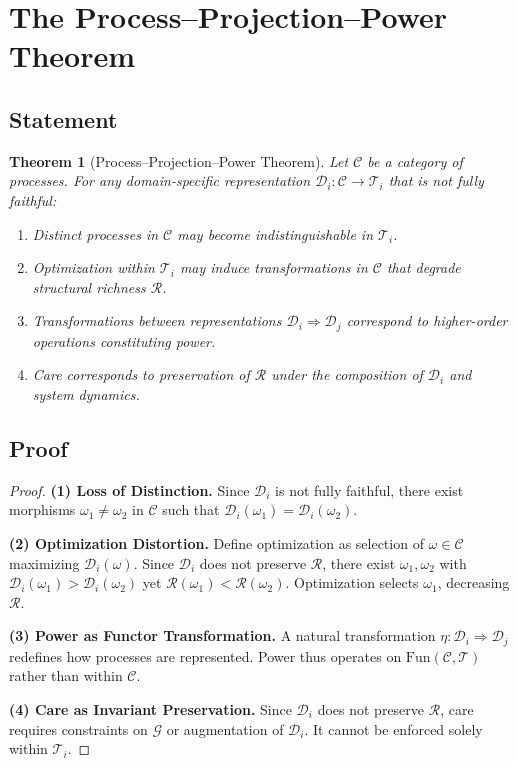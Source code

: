\documentclass[11pt,a4paper]{article}
\newtheorem{theorem}{Theorem}[section]
\theoremstyle{definition}
\theoremstyle{remark}
\begin{document}
\section{The Process--Projection--Power Theorem}

\subsection{Statement}

\begin{theorem}[Process--Projection--Power Theorem]
Let $\mathcal{C}$ be a category of processes. For any domain-specific representation $\mathcal{D}_i : \mathcal{C} \to \mathcal{T}_i$ that is not fully faithful:
\begin{enumerate}
\item Distinct processes in $\mathcal{C}$ may become indistinguishable in $\mathcal{T}_i$.
\item Optimization within $\mathcal{T}_i$ may induce transformations in $\mathcal{C}$ that degrade structural richness $\mathcal{R}$.
\item Transformations between representations $\mathcal{D}_i \Rightarrow \mathcal{D}_j$ correspond to higher-order operations constituting power.
\item Care corresponds to preservation of $\mathcal{R}$ under the composition of $\mathcal{D}_i$ and system dynamics.
\end{enumerate}
\end{theorem}

\subsection{Proof}

\begin{proof}
\textbf{(1) Loss of Distinction.} Since $\mathcal{D}_i$ is not fully faithful, there exist morphisms $\omega_1 \neq \omega_2$ in $\mathcal{C}$ such that $\mathcal{D}_i(\omega_1) = \mathcal{D}_i(\omega_2)$.

\textbf{(2) Optimization Distortion.} Define optimization as selection of $\omega \in \mathcal{C}$ maximizing $\mathcal{D}_i(\omega)$. Since $\mathcal{D}_i$ does not preserve $\mathcal{R}$, there exist $\omega_1, \omega_2$ with $\mathcal{D}_i(\omega_1) > \mathcal{D}_i(\omega_2)$ yet $\mathcal{R}(\omega_1) < \mathcal{R}(\omega_2)$. Optimization selects $\omega_1$, decreasing $\mathcal{R}$.

\textbf{(3) Power as Functor Transformation.} A natural transformation $\eta : \mathcal{D}_i \Rightarrow \mathcal{D}_j$ redefines how processes are represented. Power thus operates on $\mathrm{Fun}(\mathcal{C}, \mathcal{T})$ rather than within $\mathcal{C}$.

\textbf{(4) Care as Invariant Preservation.} Since $\mathcal{D}_i$ does not preserve $\mathcal{R}$, care requires constraints on $\mathcal{G}$ or augmentation of $\mathcal{D}_i$. It cannot be enforced solely within $\mathcal{T}_i$.
\end{proof}
\end{document}
